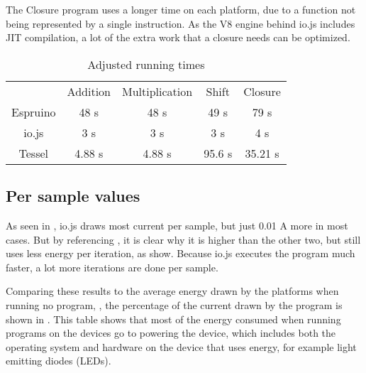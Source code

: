 The Closure program uses a longer time on each platform, due to a function not being represented by a single instruction.
As the V8 engine behind io.js includes JIT compilation, a lot of the extra work that a closure needs can be optimized.

\begin{table}[h]
\centering
\begin{tabular}{ c  c  c  c  c }
 & Addition & Multiplication & Shift & Closure \\
 \rowcolor[gray]{.9}
 Espruino & 48 \si{\second} & 48 \si{\second} & 49 \si{\second} & 79 \si{\second} \\ 
 \rowcolor[gray]{.5}
 io.js  & 3 \si{\second} & 3 \si{\second} & 3 \si{\second} & 4 \si{\second} \\ 
 \rowcolor[gray]{.9}
 Tessel & 4.88 \si{\second} & 4.88 \si{\second} & 95.6 \si{\second} & 35.21 \si{\second}\\ 
\end{tabular}
\caption{Adjusted running times}
\label{tab:fixedtimes}
\end{table}

\subsection{Per sample values}
As seen in , io.js draws most current per sample, but just 0.01 \si{\ampere} more in most cases.
But by referencing , it is clear why it is higher than the other two, but still uses less energy per iteration, as  show.
Because io.js executes the program much faster, a lot more iterations are done per sample.

Comparing these results to the average energy drawn by the platforms when running no program, , the percentage of the current drawn by the program is shown in .
This table shows that most of the energy consumed when running programs on the devices go to powering the device, which includes both the operating system and hardware on the device that uses energy, for example light emitting diodes (LEDs).


